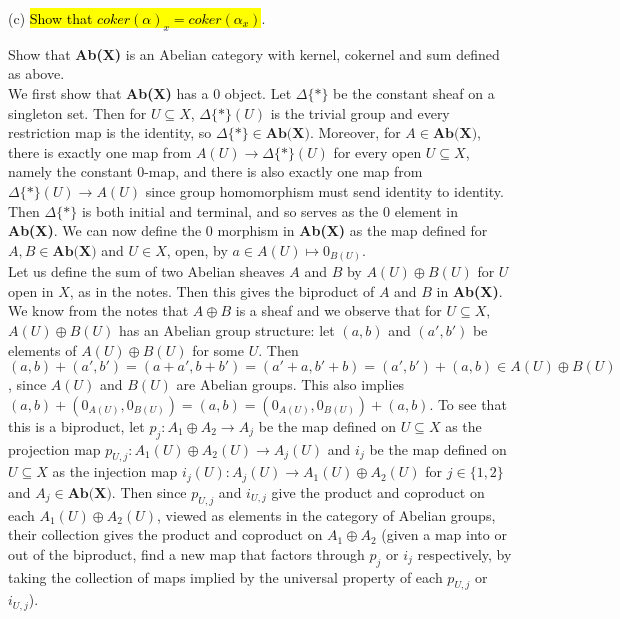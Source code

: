 (c) \hl{Show that $coker(\alpha)_x = coker(\alpha_x)$}.

 Show that \textbf{Ab(X)} is an Abelian category with kernel, cokernel and sum defined as above.\\

We first show that \textbf{Ab(X)} has a $0$ object. Let $\Delta \{*\}$ be the constant sheaf on a singleton set. Then for $U \subseteq X$,  $\Delta \{*\}(U)$ is the trivial group and every restriction map is the identity, so $\Delta \{*\} \in \textbf{Ab(X)}$. Moreover, for $A \in \textbf{Ab(X)}$, there is exactly one map from $A(U) \rightarrow \Delta \{*\}(U)$ for every open $U \subseteq X$, namely the constant $0$-map, and there is also exactly one map from $\Delta \{*\}(U) \rightarrow A(U)$ since group homomorphism must send identity to identity. Then $\Delta \{*\}$ is both initial and terminal, and so serves as the $0$ element in \textbf{Ab(X)}. We can now define the $0$ morphism in \textbf{Ab(X)} as the map defined for $A,B \in \textbf{Ab(X)}$ and $U \in X$, open, by $a \in A(U) \mapsto 0_{B(U)}$.\\

Let us define the sum of two Abelian sheaves $A$ and $B$ by $A(U) \oplus B(U)$ for $U$ open in $X$, as in the notes. Then this gives the biproduct of $A$ and $B$ in \textbf{Ab(X)}. We know from the notes that $A \oplus B$ is a sheaf and we observe that for $U \subseteq X$, $A(U) \oplus B(U)$ has an Abelian group structure: let $(a,b)$ and $(a',b')$ be elements of $A(U) \oplus B(U)$ for some $U$. Then $(a,b) + (a',b') = (a +a', b+b') = (a'+a,b'+b) = (a',b') + (a,b) \in A(U) \oplus B(U)$, since $A(U)$ and $B(U)$ are Abelian groups. This also implies $(a,b) +(0_{A(U)}, 0_{B(U)}) = (a,b) = (0_{A(U)}, 0_{B(U)}) + (a,b)$. To see that this is a biproduct, let $p_j: A_1 \oplus A_2 \rightarrow A_j$ be the map defined on $U \subseteq X$ as the projection map $p_{U,j}: A_1(U) \oplus A_2(U) \rightarrow A_j(U)$ and $i_j$ be the map defined on $U \subseteq X$ as the injection map $i_j(U): A_j(U) \rightarrow A_1(U) \oplus A_2(U) $ for $j \in \{1,2\}$ and $A_j \in \textbf{Ab(X)}$. Then since $p_{U,j}$ and $i_{U,j}$ give the product and coproduct on each $A_1(U) \oplus A_2(U)$, viewed as elements in the category of Abelian groups, their collection gives the product and coproduct on $A_1 \oplus A_2$ (given a map into or out of the biproduct, find a new map that factors through $p_j$ or $i_j$ respectively, by taking the collection of maps implied by the universal property of each $p_{U,j}$ or $i_{U,j}$).\\

